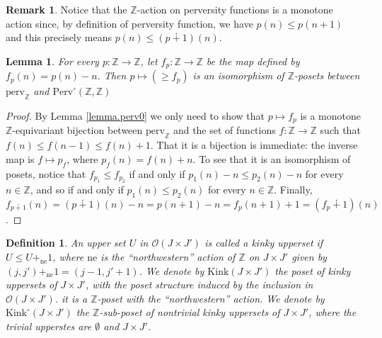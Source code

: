 \documentclass{article}
\newtheorem{lem}[thm]{Lemma}
\newtheorem{defn}[thm]{Definition}
\theoremstyle{definition}
\newtheorem{rem}[thm]{Remark}
\newcommand{\Z}{\mathbb{Z}}
\newcommand{\Oo}{\mathcal{O}}
\begin{document}
\begin{rem}
Notice that the $\Z$-action on perversity functions is a monotone action since, by definition of perversity function, we have $p(n)\leq p(n+1)$ and this precisely means $p(n)\leq (p\dotplus1)(n)$.
\end{rem}
\begin{lem}
For every $p\colon \Z \to \Z$, let $f_p\colon \Z\to \Z$ be the map defined by $f_p(n)= p(n)-n$. Then $p\mapsto (\geq f_p)$ is an isomorphism of $\Z$-posets between $\mathrm{perv}_\Z$ and $\mathrm{Perv}^\circ(\Z,\Z)$
\end{lem}
\begin{proof}
By Lemma \ref{lemma.perv0} we only need to show that $p\mapsto f_p$ is a monotone $\Z$-equivariant bijection between  $\mathrm{perv}_\Z$ and the set of functions $f\colon \Z\to \Z$ such that $f(n)\leq f(n-1)\leq f(n)+1$. That it is a bijection is immediate: the inverse map is $f\mapsto p_f$, where $p_f(n)=f(n)+n$. To see that it is an isomorphism of posets, notice that $f_{p_1}\leq f_{p_2}$ if and only if $p_1(n)-n\leq p_2(n)-n$ for every $n\in \Z$, and so if and only if $p_1(n)\leq p_2(n)$ for every $n\in \Z$. Finally, $f_{p\dotplus1}(n)=(p\dotplus 1)(n)-n=p(n+1)-n=f_p(n+1)+1=(f_p\dotplus 1)(n)$.
\end{proof}

\begin{defn}
An upper set $U$ in $\Oo(J\times J')$ is called a \emph{kinky upperset} if $U\leq U+_\mathrm{ne}1$, where ${\mathrm{ne}}$ is the ``northwestern'' action of $\Z$ on $J\times J'$ given by
$(j,j')+_{\mathrm{ne}}1=(j-1,j'+1)$. We denote by $\mathrm{Kink}(J\times J')$ the poset of kinky uppersets of $J\times J'$, with the poset structure induced by the inclusion in $\Oo(J\times J')$. it is a $\Z$-poset with the ``northwestern'' action. We denote by $\mathrm{Kink}^\circ(J\times J')$ the $\Z$-sub-poset of nontrivial kinky uppersets of $J\times J'$, where 
the trivial upperstes are $\emptyset$ and $J\times J'$.
\end{defn}
\end{document}
